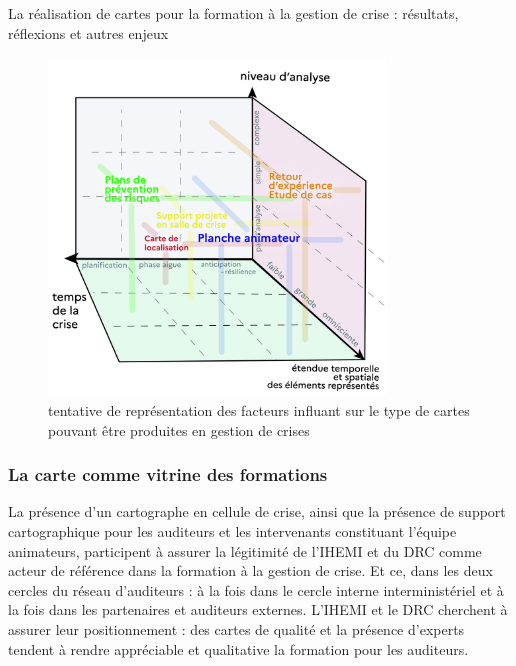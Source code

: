 \documentclass[10pt,a4paper]{report} %
\begin{document}
\begin{part}{La réalisation de cartes pour la formation à la gestion de crise : résultats, réflexions et autres enjeux}
\begin{figure}[!b]
    \includegraphics[width=0.8\textwidth]{figures/schema_cube.jpg}
    \caption{tentative de représentation des facteurs influant sur le type de cartes pouvant être produites en gestion de crises}
    \label{fig13}
\end{figure}

\subsubsection{La carte comme vitrine des formations}
La présence d’un cartographe en cellule de crise, ainsi que la présence de support cartographique pour les auditeurs et les intervenants constituant l’équipe animateurs, participent à assurer la légitimité de l’IHEMI et du DRC comme acteur de référence dans la formation à la gestion de crise. Et ce, dans les deux cercles du réseau d’auditeurs : à la fois dans le cercle interne interministériel et à la fois dans les partenaires et auditeurs externes. L’IHEMI et le DRC cherchent à assurer leur positionnement : des cartes de qualité et la présence d’experts tendent à rendre appréciable et qualitative la formation pour les auditeurs.


\end{part}
\end{document}
